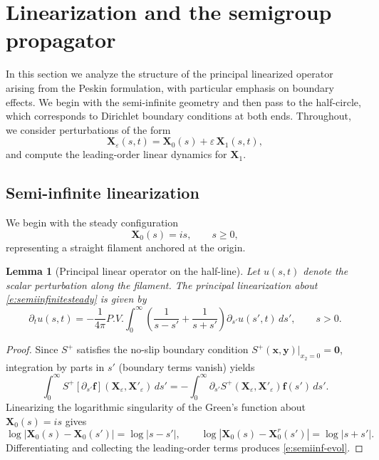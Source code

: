 \documentclass{amsart}
\newcommand{\mX}{\mathbf{X}}
\newcommand{\mf}{\mathbf{f}}
\newcommand{\e}{\varepsilon}
\newtheorem{lemma}[theorem]{Lemma}
\begin{document}

\section{Linearization and the semigroup propagator}
\label{s:linearization}

In this section we analyze the structure of the principal linearized operator
arising from the Peskin formulation, with particular emphasis on boundary
effects. We begin with the semi-infinite geometry and then pass to the
half-circle, which corresponds to Dirichlet boundary conditions at both ends.
Throughout, we consider perturbations of the form
\[
\mX_\e(s,t)=\mX_0(s)+\e\,\mX_1(s,t),
\]
and compute the leading-order linear dynamics for $\mX_1$.

\subsection{Semi-infinite linearization}

We begin with the steady configuration
\begin{equation}\label{e:semiinfinitesteady}
\mX_0(s)=is,\qquad s\ge0,
\end{equation}
representing a straight filament anchored at the origin.

\begin{lemma}[Principal linear operator on the half-line]
\label{lem:semiinf-operator}
Let $u(s,t)$ denote the scalar perturbation along the filament.
The principal linearization about \eqref{e:semiinfinitesteady} is given by
\begin{equation}\label{e:semiinf-evol}
\partial_t u(s,t)
=
-\frac{1}{4\pi}P.V.\int_0^\infty
\left(\frac{1}{s-s'}+\frac{1}{s+s'}\right)\partial_{s'}u(s',t)\,ds',
\qquad s>0.
\end{equation}
\end{lemma}

\begin{proof}
Since $S^+$ satisfies the no-slip boundary condition $S^+(\mathbf{x},\mathbf{y})\big|_{x_2=0}=\mathbf{0}$, integration by parts in $s'$ (boundary terms vanish) yields
\[
\int_0^\infty S^+[\partial_{s'}\mf](\mX_\e,\mX'_\e)\,ds'
=
-\int_0^\infty \partial_{s'}S^+(\mX_\e,\mX'_\e)\mf(s')\,ds'.
\]
Linearizing the logarithmic singularity of the Green's function about
$\mX_0(s)=is$ gives
\[
\log|\mX_0(s)-\mX_0(s')|=\log|s-s'|,
\qquad
\log|\mX_0(s)-\mX_0^r(s')|=\log|s+s'|.
\]
Differentiating and collecting the leading-order terms produces
\eqref{e:semiinf-evol}.
\end{proof}
\end{document}
